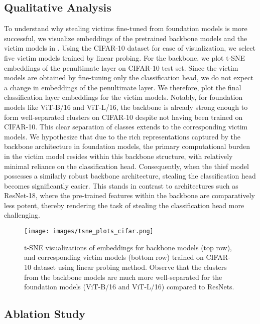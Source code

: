 {\subsection{Qualitative Analysis} \label{sec:tsne}
To understand why stealing victims fine-tuned from foundation models is more successful, we visualize embeddings of the pretrained backbone models and the victim models in . Using the CIFAR-10 dataset for ease of visualization, we select five victim models trained by linear probing. For the backbone, we plot t-SNE embeddings \cite{van2008visualizing} of the penultimate layer on CIFAR-10 test set. Since the victim models are obtained by fine-tuning only the classification head, we do not expect a change in embeddings of the penultimate layer. We therefore, plot the final classification layer embeddings for the victim models. Notably, for foundation models like ViT-B/16 and ViT-L/16, the backbone is already strong enough to form well-separated clusters on CIFAR-10 despite not having been trained on CIFAR-10. This clear separation of classes extends to the corresponding victim models. We hypothesize that due to the rich representations captured by the backbone architecture in foundation models, the primary computational burden in the victim model resides within this backbone structure, with relatively minimal reliance on the classification head. Consequently, when the thief model possesses a similarly robust backbone architecture, stealing the classification head becomes significantly easier. This stands in contrast to architectures such as ResNet-18, where the pre-trained features within the backbone are comparatively less potent, thereby rendering the task of stealing the classification head more challenging.


\begin{figure*}[t]
	\centering
	\texttt{[image: images/tsne\_plots\_cifar.png]}	
	\caption{t-SNE  visualizations {\protect\cite{van2008visualizing}} of embeddings for backbone models (top row), and corresponding victim models (bottom row) trained on CIFAR-10 dataset using linear probing method. Observe that the clusters from the backbone models are much more well-separated for the foundation models (ViT-B/16 and ViT-L/16) compared to ResNets. }
	\label{fig:tsne_plots}
\end{figure*}

\subsection{Ablation Study} \label{sec:ablation}

}
